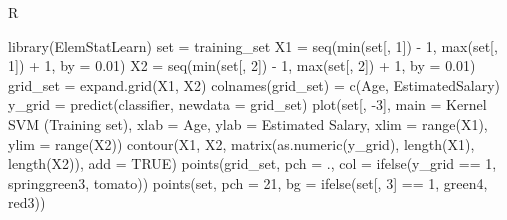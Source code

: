 \documentclass[
]{book}
\newenvironment{Shaded}{\begin{snugshade}}{\end{snugshade}}
\newcommand{\AttributeTok}[1]{\textcolor[rgb]{0.77,0.63,0.00}{#1}}
\newcommand{\ConstantTok}[1]{\textcolor[rgb]{0.00,0.00,0.00}{#1}}
\newcommand{\DecValTok}[1]{\textcolor[rgb]{0.00,0.00,0.81}{#1}}
\newcommand{\FloatTok}[1]{\textcolor[rgb]{0.00,0.00,0.81}{#1}}
\newcommand{\FunctionTok}[1]{\textcolor[rgb]{0.00,0.00,0.00}{#1}}
\newcommand{\NormalTok}[1]{#1}
\newcommand{\OtherTok}[1]{\textcolor[rgb]{0.56,0.35,0.01}{#1}}
\newcommand{\SpecialCharTok}[1]{\textcolor[rgb]{0.00,0.00,0.00}{#1}}
\newcommand{\StringTok}[1]{\textcolor[rgb]{0.31,0.60,0.02}{#1}}
\theoremstyle{definition}
\theoremstyle{definition}
\theoremstyle{definition}
\theoremstyle{definition}
\theoremstyle{remark}
\begin{document}
R

\begin{Shaded}
\begin{Highlighting}[]
\FunctionTok{library}\NormalTok{(ElemStatLearn)}
\NormalTok{set }\OtherTok{=}\NormalTok{ training\_set}
\NormalTok{X1 }\OtherTok{=} \FunctionTok{seq}\NormalTok{(}\FunctionTok{min}\NormalTok{(set[, }\DecValTok{1}\NormalTok{]) }\SpecialCharTok{{-}} \DecValTok{1}\NormalTok{, }\FunctionTok{max}\NormalTok{(set[, }\DecValTok{1}\NormalTok{]) }\SpecialCharTok{+} \DecValTok{1}\NormalTok{, }\AttributeTok{by =} \FloatTok{0.01}\NormalTok{)}
\NormalTok{X2 }\OtherTok{=} \FunctionTok{seq}\NormalTok{(}\FunctionTok{min}\NormalTok{(set[, }\DecValTok{2}\NormalTok{]) }\SpecialCharTok{{-}} \DecValTok{1}\NormalTok{, }\FunctionTok{max}\NormalTok{(set[, }\DecValTok{2}\NormalTok{]) }\SpecialCharTok{+} \DecValTok{1}\NormalTok{, }\AttributeTok{by =} \FloatTok{0.01}\NormalTok{)}
\NormalTok{grid\_set }\OtherTok{=} \FunctionTok{expand.grid}\NormalTok{(X1, X2)}
\FunctionTok{colnames}\NormalTok{(grid\_set) }\OtherTok{=} \FunctionTok{c}\NormalTok{(}\StringTok{\textquotesingle{}Age\textquotesingle{}}\NormalTok{, }\StringTok{\textquotesingle{}EstimatedSalary\textquotesingle{}}\NormalTok{)}
\NormalTok{y\_grid }\OtherTok{=} \FunctionTok{predict}\NormalTok{(classifier, }\AttributeTok{newdata =}\NormalTok{ grid\_set)}
\FunctionTok{plot}\NormalTok{(set[, }\SpecialCharTok{{-}}\DecValTok{3}\NormalTok{],}
     \AttributeTok{main =} \StringTok{\textquotesingle{}Kernel SVM (Training set)\textquotesingle{}}\NormalTok{,}
     \AttributeTok{xlab =} \StringTok{\textquotesingle{}Age\textquotesingle{}}\NormalTok{, }\AttributeTok{ylab =} \StringTok{\textquotesingle{}Estimated Salary\textquotesingle{}}\NormalTok{,}
     \AttributeTok{xlim =} \FunctionTok{range}\NormalTok{(X1), }\AttributeTok{ylim =} \FunctionTok{range}\NormalTok{(X2))}
\FunctionTok{contour}\NormalTok{(X1, X2, }\FunctionTok{matrix}\NormalTok{(}\FunctionTok{as.numeric}\NormalTok{(y\_grid), }\FunctionTok{length}\NormalTok{(X1), }\FunctionTok{length}\NormalTok{(X2)), }\AttributeTok{add =} \ConstantTok{TRUE}\NormalTok{)}
\FunctionTok{points}\NormalTok{(grid\_set, }\AttributeTok{pch =} \StringTok{\textquotesingle{}.\textquotesingle{}}\NormalTok{, }\AttributeTok{col =} \FunctionTok{ifelse}\NormalTok{(y\_grid }\SpecialCharTok{==} \DecValTok{1}\NormalTok{, }\StringTok{\textquotesingle{}springgreen3\textquotesingle{}}\NormalTok{, }\StringTok{\textquotesingle{}tomato\textquotesingle{}}\NormalTok{))}
\FunctionTok{points}\NormalTok{(set, }\AttributeTok{pch =} \DecValTok{21}\NormalTok{, }\AttributeTok{bg =} \FunctionTok{ifelse}\NormalTok{(set[, }\DecValTok{3}\NormalTok{] }\SpecialCharTok{==} \DecValTok{1}\NormalTok{, }\StringTok{\textquotesingle{}green4\textquotesingle{}}\NormalTok{, }\StringTok{\textquotesingle{}red3\textquotesingle{}}\NormalTok{))}
\end{Highlighting}
\end{Shaded}
\end{document}
